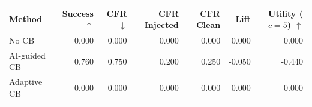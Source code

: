 \begin{tabular}{lrrrrrr}
\toprule
Method & Success $\uparrow$ & CFR $\downarrow$ & CFR Injected & CFR Clean & Lift & Utility ($c=5$) $\uparrow$ \\
\midrule
No CB & 0.000 & 0.000 & 0.000 & 0.000 & 0.000 & 0.000 \\
AI-guided CB & 0.760 & 0.750 & 0.200 & 0.250 & -0.050 & -0.440 \\
Adaptive CB & 0.000 & 0.000 & 0.000 & 0.000 & 0.000 & 0.000 \\
\bottomrule
\end{tabular}

